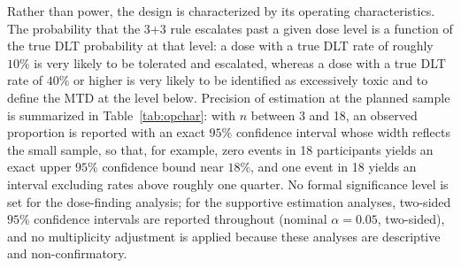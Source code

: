 Rather than power, the design is characterized by its operating characteristics.
The probability that the 3+3 rule escalates past a given dose level is a function
of the true DLT probability at that level: a dose with a true DLT rate of roughly
$10\%$ is very likely to be tolerated and escalated, whereas a dose with a true
DLT rate of $40\%$ or higher is very likely to be identified as excessively toxic
and to define the MTD at the level below. Precision of estimation at the planned
sample is summarized in Table~\ref{tab:opchar}: with $n$ between 3 and 18, an
observed proportion is reported with an exact $95\%$ confidence interval whose
width reflects the small sample, so that, for example, zero events in 18
participants yields an exact upper $95\%$ confidence bound near $18\%$, and one
event in 18 yields an interval excluding rates above roughly one quarter. No
formal significance level is set for the dose-finding analysis; for the supportive
estimation analyses, two-sided $95\%$ confidence intervals are reported throughout
(nominal $\alpha = 0.05$, two-sided), and no multiplicity adjustment is applied
because these analyses are descriptive and non-confirmatory.

